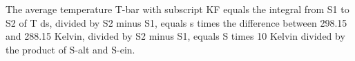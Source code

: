 The average temperature T-bar with subscript KF equals the integral from S1 to S2 of T ds, divided by S2 minus S1, equals s times the difference between 298.15 and 288.15 Kelvin, divided by S2 minus S1, equals S times 10 Kelvin divided by the product of S-alt and S-ein.